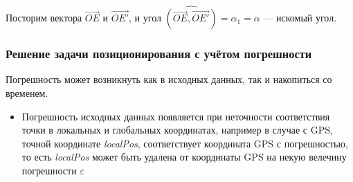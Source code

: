 \documentclass[a4paper, 11pt, titlepage]{article}
\begin{document}
          Посторим вектора $\vec{OE}$ и $\vec{OE'}$, и угол $\widehat{(\vec{OE}, \vec{OE'})} = \alpha_1 = \alpha$ --- искомый угол.

            
        \subsubsection{Решение задачи позиционирования с учётом погрешности}
          Погрешность может возникнуть как в исходных данных, так и накопиться со временем.
          \begin{itemize}
             \item Погрешность исходных данных появляется при неточности соответствия точки в локальных и глобальных координатах,
             например в случае с GPS, точной координате \textit{localPos}, соответствует координата GPS с погрешностью, то есть \textit{localPos}
             может быть удалена от координаты GPS на некую велечину погрешности $\varepsilon$ 
             \begin{figure}[H]
              \centering
\end{figure}
\end{itemize}
\end{document}
